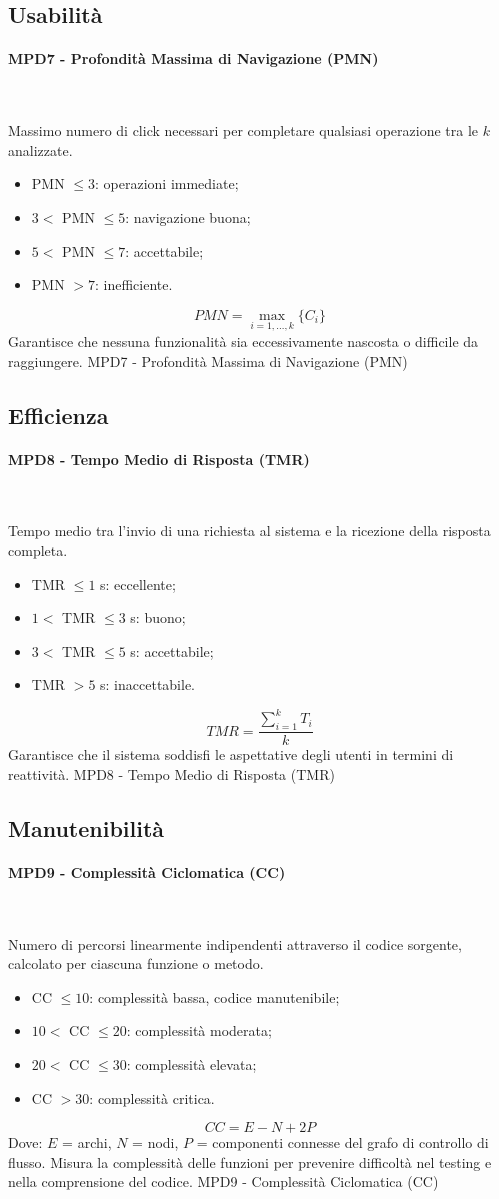 \documentclass[10pt, letterpaper]{article}
\newcommand{\trisubsection}[1]{\paragraph{#1}\mbox{}\\}
\begin{document}
\subsection{Usabilità}
\trisubsection{MPD7 - Profondità Massima di Navigazione (PMN)}
{Massimo numero di click necessari per completare qualsiasi operazione tra le $k$ analizzate.
    \begin{itemize}
        \item PMN $\leq 3$: operazioni immediate;
        \item $3 <$ PMN $\leq 5$: navigazione buona;
        \item $5 <$ PMN $\leq 7$: accettabile;
        \item PMN $> 7$: inefficiente.
    \end{itemize}}
{\[ PMN = \max_{i=1,\dots,k} \{C_i\} \]}
{Garantisce che nessuna funzionalità sia eccessivamente nascosta o difficile da raggiungere.}
{MPD7 - Profondità Massima di Navigazione (PMN)}

\subsection{Efficienza}
\trisubsection{MPD8 - Tempo Medio di Risposta (TMR)}
{Tempo medio tra l'invio di una richiesta al sistema e la ricezione della risposta completa.
    \begin{itemize}
        \item TMR $\leq 1$ s: eccellente;
        \item $1 <$ TMR $\leq 3$ s: buono;
        \item $3 <$ TMR $\leq 5$ s: accettabile;
        \item TMR $> 5$ s: inaccettabile.
    \end{itemize}}
{\[ TMR = \frac{\sum_{i=1}^{k} T_i}{k} \]}
{Garantisce che il sistema soddisfi le aspettative degli utenti in termini di reattività.}
{MPD8 - Tempo Medio di Risposta (TMR)}

\subsection{Manutenibilità}
\trisubsection{MPD9 - Complessità Ciclomatica (CC)}
{Numero di percorsi linearmente indipendenti attraverso il codice sorgente, calcolato per ciascuna funzione o metodo.
    \begin{itemize}
        \item CC $\leq 10$: complessità bassa, codice manutenibile;
        \item $10 <$ CC $\leq 20$: complessità moderata;
        \item $20 <$ CC $\leq 30$: complessità elevata;
        \item CC $> 30$: complessità critica.
    \end{itemize}}
{\[ CC = E - N + 2P \]
    Dove: $E$ = archi, $N$ = nodi, $P$ = componenti connesse del grafo di controllo di flusso.
}
{Misura la complessità delle funzioni per prevenire difficoltà nel testing e nella comprensione del codice.}
{MPD9 - Complessità Ciclomatica (CC)}
\end{document}
